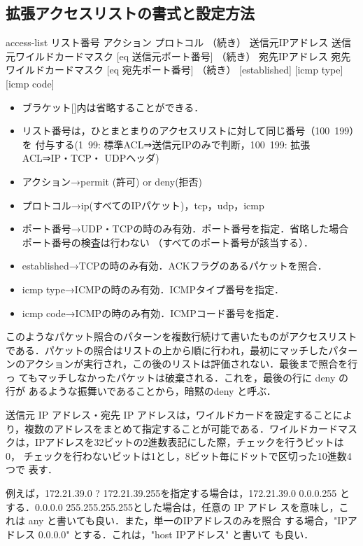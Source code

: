 \subsection*{拡張アクセスリストの書式と設定方法}

\begin{cli}
[拡張ACL書式]
access-list  リスト番号  アクション  プロトコル
（続き） 送信元IPアドレス  送信元ワイルドカードマスク [eq  送信元ポート番号]
（続き）   宛先IPアドレス    宛先ワイルドカードマスク [eq    宛先ポート番号]
（続き）   [established] [icmp type] [icmp code]
\end{cli}

\begin{itemize}
 \item ブラケット[]内は省略することができる．
 \item リスト番号は，ひとまとまりのアクセスリストに対して同じ番号（100~199）を
付与する(1~99: 標準ACL⇒送信元IPのみで判断，100~199: 拡張ACL⇒IP・TCP・
       UDPヘッダ)
 \item アクション→permit (許可) or deny(拒否)
 \item プロトコル→ip(すべてのIPパケット)，tcp，udp，icmp
 \item ポート番号→UDP・TCPの時のみ有効．ポート番号を指定．省略した場合ポート番号の検査は行わない
（すべてのポート番号が該当する）．
 \item established→TCPの時のみ有効．ACKフラグのあるパケットを照合．
 \item icmp type→ICMPの時のみ有効．ICMPタイプ番号を指定．
 \item icmp code→ICMPの時のみ有効．ICMPコード番号を指定．
\end{itemize}

このようなパケット照合のパターンを複数行続けて書いたものがアクセスリスト
である．パケットの照合はリストの上から順に行われ，最初にマッチしたパター
ンのアクションが実行され，この後のリストは評価されない．最後まで照合を行っ
てもマッチしなかったパケットは破棄される．これを，最後の行に deny の行が
あるような振舞いであることから，暗黙のdeny と呼ぶ．

送信元 IP アドレス・宛先 IP アドレスは，ワイルドカードを設定することによ
り，複数のアドレスをまとめて指定することが可能である．ワイルドカードマス
クは，IPアドレスを32ビットの2進数表記にした際，チェックを行うビットは0，
チェックを行わないビットは1とし，8ビット毎にドットで区切った10進数4つで
表す．

例えば，172.21.39.0 ? 172.21.39.255を指定する場合は，172.21.39.0
0.0.0.255 とする．0.0.0.0 255.255.255.255とした場合は，任意の IP アドレ
スを意味し，これは any と書いても良い．また，単一のIPアドレスのみを照合
する場合，"IPアドレス  0.0.0.0" とする．これは，"host  IPアドレス" と書いて
も良い．

